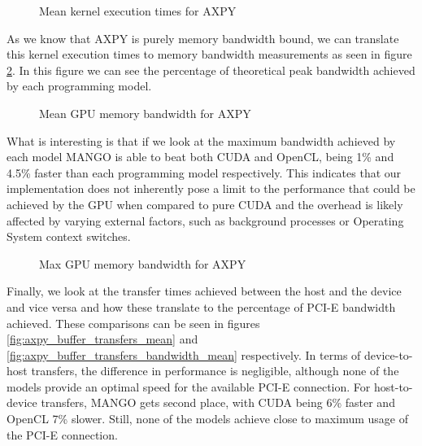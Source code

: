 \begin{figure}
    \centering
    \resizebox{!}{160pt}{
        
    }
    \captionsetup{justification=centering}
    \caption{Mean kernel execution times for AXPY}
    \label{fig:axpy_kernel_executions_mean}
\end{figure}

As we know that AXPY is purely memory bandwidth bound, we can translate this kernel execution times to memory bandwidth measurements as seen in figure \ref{fig:axpy_bandwidth_mean}. In this figure we can see the percentage of theoretical peak bandwidth achieved by each programming model.

\begin{figure}
    \centering
    \resizebox{!}{160pt}{
        
    }
    \captionsetup{justification=centering}
    \caption{Mean GPU memory bandwidth for AXPY}
    \label{fig:axpy_bandwidth_mean}
\end{figure}

What is interesting is that if we look at the maximum bandwidth achieved by each model MANGO is able to beat both CUDA and OpenCL, being 1\% and 4.5\% faster than each programming model respectively. This indicates that our implementation does not inherently pose a limit to the performance that could be achieved by the GPU when compared to pure CUDA and the overhead is likely affected by varying external factors, such as background processes or Operating System context switches. 

\begin{figure}
    \centering
    \resizebox{!}{160pt}{
        
    }
    \captionsetup{justification=centering}
    \caption{Max GPU memory bandwidth for AXPY}
    \label{fig:axpy_bandwidth_max}
\end{figure}

Finally, we look at the transfer times achieved between the host and the device and vice versa and how these translate to the percentage of PCI-E bandwidth achieved. These comparisons can be seen in figures \ref{fig:axpy_buffer_transfers_mean} and \ref{fig:axpy_buffer_transfers_bandwidth_mean} respectively. In terms of device-to-host transfers, the difference in performance is negligible, although none of the models provide an optimal speed for the available PCI-E connection. For host-to-device transfers, MANGO gets second place, with CUDA being 6\% faster and OpenCL 7\% slower. Still, none of the models achieve close to maximum usage of the PCI-E connection.

